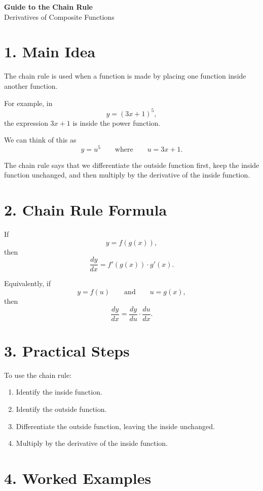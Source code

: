 \documentclass[12pt]{article}
\begin{document}
	
	\begin{center}
		{\Large \textbf{Guide to the Chain Rule}}\\[0.2cm]
		{\large Derivatives of Composite Functions}
	\end{center}
	
	\section*{1. Main Idea}
	
	The chain rule is used when a function is made by placing one function inside another function.
	
	For example, in
	\[
	y=(3x+1)^5,
	\]
	the expression \(3x+1\) is inside the power function.
	
	We can think of this as
	\[
	y=u^5
	\qquad \text{where} \qquad
	u=3x+1.
	\]
	
	The chain rule says that we differentiate the outside function first, keep the inside function unchanged, and then multiply by the derivative of the inside function.
	
	\section*{2. Chain Rule Formula}
	
	If
	\[
	y=f(g(x)),
	\]
	then
	\[
	\frac{dy}{dx}=f'(g(x))\cdot g'(x).
	\]
	
	Equivalently, if
	\[
	y=f(u)
	\qquad \text{and} \qquad
	u=g(x),
	\]
	then
	\[
	\frac{dy}{dx}=\frac{dy}{du}\cdot \frac{du}{dx}.
	\]
	
	\section*{3. Practical Steps}
	
	To use the chain rule:
	
	\begin{enumerate}
		\item Identify the inside function.
		\item Identify the outside function.
		\item Differentiate the outside function, leaving the inside unchanged.
		\item Multiply by the derivative of the inside function.
	\end{enumerate}
	
	\section*{4. Worked Examples}
	
\end{document}
